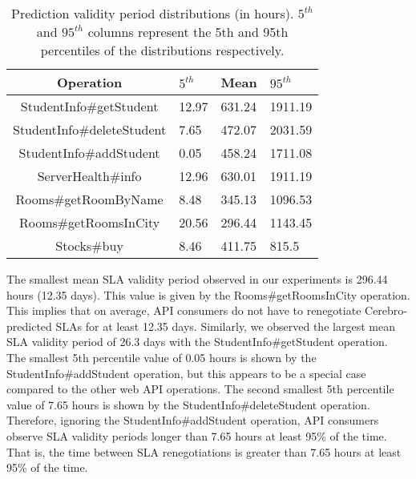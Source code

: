 \begin{table}
\begin{center}
\begin{tabular}{|c|p{2cm}|p{2cm}|p{2cm}|}
\hline
Operation & $5^{th}$ & Mean & $95^{th}$ \\ \hline
StudentInfo\#getStudent & 12.97 & 631.24 & 1911.19 \\ \hline
StudentInfo\#deleteStudent & 7.65 & 472.07 & 2031.59 \\ \hline
StudentInfo\#addStudent & 0.05 & 458.24 & 1711.08 \\ \hline
ServerHealth\#info & 12.96 & 630.01 & 1911.19 \\ \hline
Rooms\#getRoomByName & 8.48 & 345.13 & 1096.53 \\ \hline
Rooms\#getRoomsInCity & 20.56 & 296.44 & 1143.45 \\ \hline
Stocks\#buy & 8.46 & 411.75 & 815.5 \\ \hline
\end{tabular}
\end{center}
\caption{Prediction validity period distributions (in hours).
$5^{th}$ and $95^{th}$ 
columns represent the 5th and 95th percentiles of the
distributions respectively.
\label{tab:validity_periods}
}
\end{table}

The smallest
mean SLA validity period observed in our experiments is 296.44 hours (12.35 days). This value is given by the
Rooms\#getRoomsInCity operation. 
This implies that on average, API consumers do not have to renegotiate Cerebro-predicted SLAs
for at least 12.35 days. Similarly, we observed the largest mean SLA validity period of 26.3 days with the
StudentInfo\#getStudent operation.
The smallest 5th percentile value of 0.05 hours is shown by
the StudentInfo\#addStudent operation, but this appears to be a special case compared to the other web API
operations. The second smallest 5th percentile value of 7.65 hours is shown by the 
StudentInfo\#deleteStudent operation. Therefore, ignoring the StudentInfo\#addStudent operation, API
consumers observe SLA validity periods longer than 7.65 hours at least 95\% of the time. That is, the time
between SLA renegotiations is greater than 7.65 hours at least 95\% of the time.

